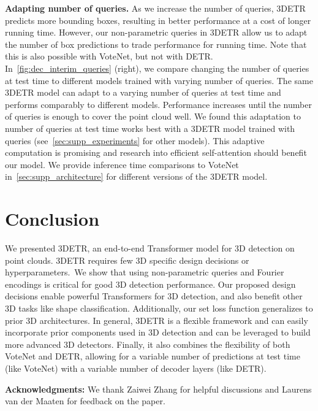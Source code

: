 \documentclass[10pt,twocolumn,letterpaper]{article}
\newcommand{\OURS}{3DETR\xspace}
\begin{document}
\vspace{0.06in}
\par \noindent \textbf{Adapting number of queries.}
As we increase the number of queries, \OURS predicts more bounding boxes, resulting in better performance at a cost of longer running time.
However, our non-parametric queries in \OURS allow us to adapt the number of box predictions to trade performance for running time. Note that this is also possible with VoteNet, but not with DETR.
In~\cref{fig:dec_interim_queries} (right), we compare changing the number of queries at test time to different models trained with varying number of queries.
The same \OURS model can adapt to a varying number of queries at test time and performs comparably to different models.
Performance increases until the number of queries is enough to cover the point cloud well.
We found this adaptation to number of queries at test time works best with a \OURS model trained with  queries (see~\cref{sec:supp_experiments} for other models).
This adaptive computation is promising and research into efficient self-attention should benefit our model.
We provide inference time comparisons to VoteNet in~\cref{sec:supp_architecture} for different versions of the \OURS model.










\vspace{-0.05in}
\section{Conclusion}
\label{sec:conclusion}
\vspace{-0.05in}

We presented \OURS, an end-to-end Transformer model for 3D detection on point clouds.
\OURS requires few 3D specific design decisions or hyperparameters.\
We show that using non-parametric queries and Fourier encodings is critical for good 3D detection performance.
Our proposed design decisions enable powerful Transformers for 3D detection, and also benefit other 3D tasks like shape classification.
Additionally, our set loss function generalizes to prior 3D architectures.
In general, \OURS is a flexible framework and can easily incorporate prior components used in 3D detection and can be leveraged to build more advanced 3D detectors.
Finally, it also combines the flexibility of both VoteNet and DETR, allowing for a variable number of predictions at test time (like VoteNet) with a variable number of decoder layers (like DETR).
\vspace{0.05in}
{\small
\par \noindent \textbf{Acknowledgments:} We thank Zaiwei Zhang for helpful discussions and Laurens van der Maaten for feedback on the paper.
}
\end{document}
